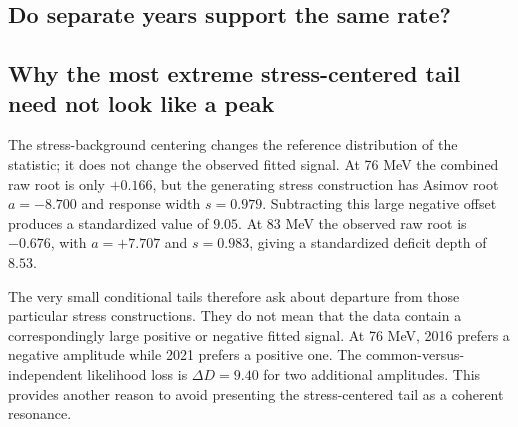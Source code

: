 \clearpage
\begin{landscape}
\subsection*{Do separate years support the same rate?}

\end{landscape}

\clearpage
\subsection*{Why the most extreme stress-centered tail need not look like a peak}
The stress-background centering changes the reference distribution of the statistic; it does not change the observed fitted signal. At 76 MeV the combined raw root is only $+0.166$, but the generating stress construction has Asimov root $a=-8.700$ and response width $s=0.979$. Subtracting this large negative offset produces a standardized value of $9.05$. At 83 MeV the observed raw root is $-0.676$, with $a=+7.707$ and $s=0.983$, giving a standardized deficit depth of $8.53$.

The very small conditional tails therefore ask about departure from those particular stress constructions. They do not mean that the data contain a correspondingly large positive or negative fitted signal. At 76 MeV, 2016 prefers a negative amplitude while 2021 prefers a positive one. The common-versus-independent likelihood loss is $\Delta D=9.40$ for two additional amplitudes. This provides another reason to avoid presenting the stress-centered tail as a coherent resonance.


